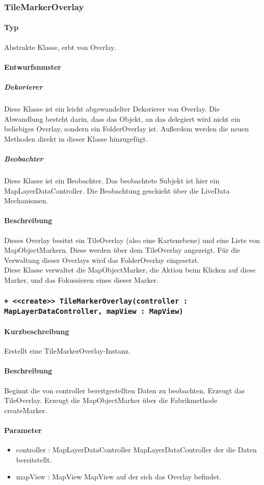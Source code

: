 \subsubsection{TileMarkerOverlay}
\paragraph*{Typ} 
Abstrakte Klasse, erbt von Overlay.
\paragraph*{Entwurfsmuster}
\subparagraph*{Dekorierer}
Diese Klasse ist ein leicht abgewandelter Dekorierer von Overlay.
Die Abwandlung besteht darin, dass das Objekt, an das delegiert wird nicht ein
beliebiges Overlay, sondern ein FolderOverlay ist. Außerdem werden die neuen 
Methoden direkt in dieser Klasse hinzugefügt.\\
\subparagraph*{Beobachter}
Diese Klasse ist ein Beobachter. Das beobachtete Subjekt ist hier ein MapLayerDataController.
Die Beobachtung geschieht über die LiveData Mechanismen.
\paragraph*{Beschreibung}
Dieses Overlay besitzt ein TileOverlay (also eine Kartenebene) und eine 
Liste von MapObjectMarkern. Diese werden über dem TileOverlay angezeigt.
Für die Verwaltung dieser Overlays wird das FolderOverlay eingesetzt.\\
Diese Klasse verwaltet die MapObjectMarker, die Aktion beim Klicken auf diese Marker, 
und das Fokussieren eines dieser Marker.

\subsubsection*{\texttt{+ <<create>> TileMarkerOverlay(controller : MapLayerDataController, mapView : MapView)}}%
\paragraph*{Kurzbeschreibung}
Erstellt eine TileMarkerOverlay-Instanz.
\paragraph*{Beschreibung}
Beginnt die von controller bereitgestellten Daten zu beobachten. Erzeugt das TileOverlay.
Erzeugt die MapObjectMarker über die Fabrikmethode createMarker.
\paragraph*{Parameter}
\begin{itemize}
    \item controller : MapLayerDataController MapLayerDataController der die Daten bereitstellt.
    \item mapView : MapView MapView auf der sich das Overlay befindet.
\end{itemize}

